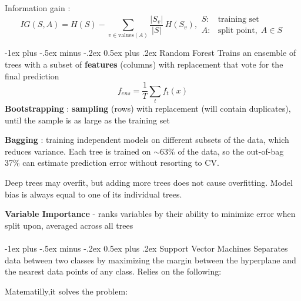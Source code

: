 \documentclass[10pt,landscape]{article}
\makeatletter
\renewcommand{\section}{\@startsection{section}{1}{0mm}%
                                {-1ex plus -.5ex minus -.2ex}%
                                {0.5ex plus .2ex}%
                                {\normalfont\large\bfseries}}
\renewcommand{\subsection}{\@startsection{subsection}{2}{0mm}%
                                {-1ex plus -.5ex minus -.2ex}%
                                {0.5ex plus .2ex}%
                                {\normalfont\normalsize\bfseries}}
\makeatother
\begin{document}
\begin{multicols}{3}
    Information gain :
    $$IG(S,A) = H(S) - \sum_{v \in \mathrm{values}(A)}\frac{\lvert S_v \rvert}{\lvert S \rvert}\, H(S_v)
        ,
        \begin{array}{rl}
            S: & \text{training set}           \\[2pt]
            A: & \text{split point},\; A \in S
        \end{array}
    $$

    \subsection{Random Forest}
    Trains an ensemble of trees with a subset of \textbf{features} (columns) with replacement that vote for the final prediction
    $$f_{ens}=\frac{1}{T} \sum_{t}f_t(x)$$
    \textbf{Bootstrapping} : \textbf{sampling} (rows) with replacement (will contain duplicates), until the sample is as large as the training set

    \textbf{Bagging} : training independent models on different subsets of the data, which reduces variance. Each tree is trained on $\sim$63\% of the data, so the out-of-bag 37\% can estimate prediction error without resorting to CV.

    Deep trees may overfit, but adding more trees does not cause overfitting. Model bias is always equal to one of its individual trees.

    \textbf{Variable Importance} - ranks variables by their ability to minimize error when split upon, averaged across all trees
    \\\textcolor{white}{.}\vspace{-5mm}\\ %

    \section{Support Vector Machines}
    Separates data between two classes by maximizing the margin between the hyperplane and the nearest data points of any class. Relies on the following:

    Matematilly,it solves the problem:


\end{multicols}
\end{document}
